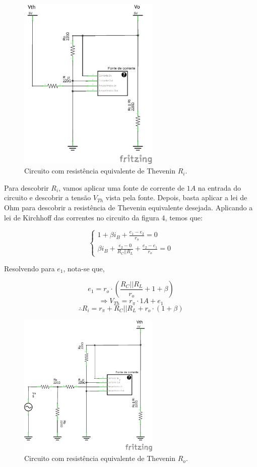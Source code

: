 \documentclass[12pt, a4paper, twoside]{article}
\begin{document}
\begin{figure}[H]
    \centering
    \includegraphics[width=0.6\textwidth]{figs/rel6/ex4i.png}
    \caption{Circuito com resistência equivalente de Thevenin $R_i$.}
\end{figure}

Para descobrir $R_i$, vamos aplicar uma fonte de corrente de $1A$ na entrada do circuito e descobrir a tensão $V_{Th}$ vista pela fonte. Depois, basta aplicar a lei de Ohm para descobrir a resistência de Thevenin equivalente desejada. Aplicando a lei de Kirchhoff das correntes no circuito da figura 4, temos que:

\begin{equation}
    \begin{cases}
        1 + \beta i_B + \frac{e_1 - e_2}{r_o} = 0 \\
        \beta i_B + \frac{e_2 - 0}{R_C || R_L} + \frac{e_2 - e_1}{r_o} = 0
    \end{cases}
\end{equation}

Resolvendo para $e_1$, nota-se que,

$$ e_1 = r_o \cdot \left( \frac{R_C || R_L}{r_o} + 1 + \beta \right) $$
$$ \Rightarrow V_{Th} = r_\pi \cdot 1A + e_1 $$
$$ \therefore R_i = r_\pi + R_C || R_L + r_o \cdot (1 + \beta) $$

\begin{figure}[H]
    \centering
    \includegraphics[width=0.6\textwidth]{figs/rel6/ex4o.png}
    \caption{Circuito com resistência equivalente de Thevenin $R_o$.}
\end{figure}
\end{document}
